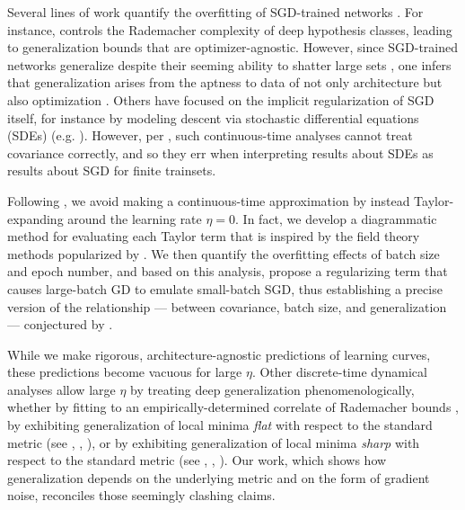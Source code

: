 \documentclass{article}
\theoremstyle{plain}
\theoremstyle{definition}
\begin{document}

    Several lines of work quantify the overfitting of SGD-trained networks
    \citep{ne17a}.  For instance, \citet{ba17} controls the Rademacher
    complexity of deep hypothesis classes, leading to generalization bounds
    that are optimizer-agnostic.  However, since SGD-trained networks
    generalize despite their seeming ability to shatter large sets
    \citep{zh17}, one infers that generalization arises from the aptness to
    data of not only architecture but also optimization \citep{ne17b}.  Others
    have focused on the implicit regularization of SGD itself, for instance by
    modeling descent via stochastic differential equations (SDEs) (e.g.
    \citet{ch18}).  However, per \citet{ya19a}, such continuous-time analyses
    cannot treat covariance correctly, and so they err when interpreting
    results about SDEs as results about SGD for finite trainsets.


    Following
    \citet{ro18}, we avoid making a continuous-time
    approximation by instead Taylor-expanding around the learning rate
    $\eta=0$.  In fact, we develop a diagrammatic method for evaluating each
    Taylor term that is inspired by the field theory methods popularized by
    \citet{dy49a}.  We then quantify the overfitting effects
    of batch size and epoch number, and based on this analysis, propose a
    regularizing term that causes large-batch GD to emulate small-batch SGD,
    thus establishing a precise version of the relationship --- between
    covariance, batch size, and generalization --- conjectured by \citet{ja18}.  
    

    While we make rigorous, architecture-agnostic predictions of learning
    curves, these predictions become vacuous for large $\eta$. 
    Other discrete-time dynamical analyses allow large $\eta$ by treating deep
    generalization phenomenologically, whether by fitting to an
    empirically-determined correlate of Rademacher bounds \citep{li18}, by
    exhibiting generalization of local minima \emph{flat} with respect to the
    standard metric (see \citet{ho17}, \citet{ke17}, \citet{wa18}), or by
    exhibiting generalization of local minima \emph{sharp} with respect to the
    standard metric (see \citet{st56}, \citet{di17}, \citet{wu18}).  Our work,
    which shows how generalization depends on the underlying
    metric and on the form of gradient noise, reconciles those
    seemingly clashing claims.
    
\end{document}
